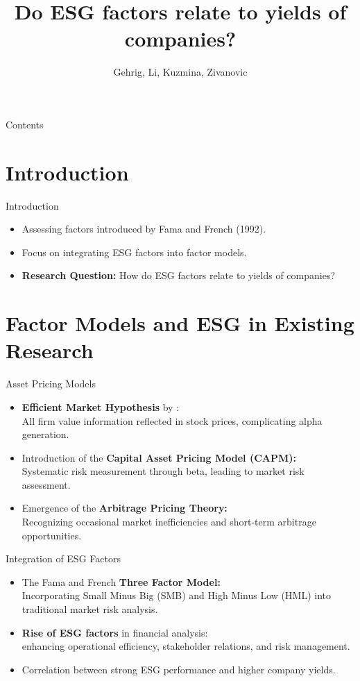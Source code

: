 \documentclass{beamer}
\title[]{Do ESG factors relate to yields of companies?}
\author{Gehrig, Li, Kuzmina, Zivanovic}
\begin{document}
\begin{frame}
  \titlepage
\end{frame}

\begin{frame}{Contents}
  \tableofcontents
\end{frame}

\section{Introduction}
\begin{frame}{Introduction}
  \begin{itemize}
    \item Assessing factors introduced by Fama and French (1992).
    \item Focus on integrating ESG factors into factor models.
    \item \textbf{Research Question:} How do ESG factors relate to yields of companies?
  \end{itemize}
\end{frame}

\section{Factor Models and ESG in Existing Research}
\begin{frame}{Asset Pricing Models}
  \begin{itemize}
    \item \textbf{Efficient Market Hypothesis} by \textcite{Fama, 1970}: \\ All firm value information reflected in stock prices, complicating alpha generation.
    \item Introduction of the \textbf{Capital Asset Pricing Model (CAPM):}\\
    Systematic risk measurement through beta, leading to market risk assessment.
    \item Emergence of the \textbf{Arbitrage Pricing Theory:} \\
    Recognizing occasional market inefficiencies and short-term arbitrage opportunities.
  \end{itemize}
\end{frame}

\begin{frame}{Integration of ESG Factors}
  \begin{itemize}
    \item The Fama and French \textbf{Three Factor Model:} \\ Incorporating Small Minus Big (SMB) and High Minus Low (HML) into traditional market risk analysis.
    \item \textbf{Rise of ESG factors} in financial analysis: \\
     enhancing operational efficiency, stakeholder relations, and risk management.
    \item Correlation between strong ESG performance and higher company yields.
  \end{itemize}
\end{frame}
\end{document}

